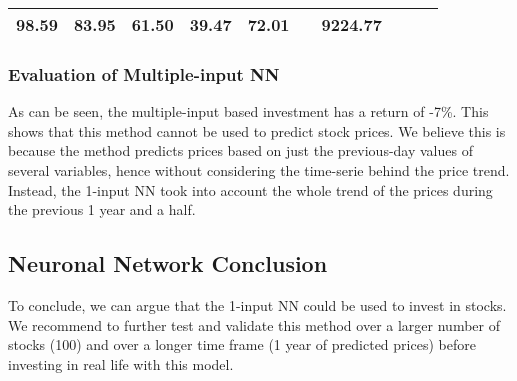 \documentclass[
  11pt,
]{article}
\begin{document}
\begin{longtable}[]{@{}llllllllll@{}}
\begin{minipage}[t]{0.06\columnwidth}
98.59\strut
\end{minipage} & \begin{minipage}[t]{0.06\columnwidth}\raggedright
83.95\strut
\end{minipage} & \begin{minipage}[t]{0.06\columnwidth}\raggedright
61.50\strut
\end{minipage} & \begin{minipage}[t]{0.06\columnwidth}\raggedright
39.47\strut
\end{minipage} & \begin{minipage}[t]{0.06\columnwidth}\raggedright
72.01\strut
\end{minipage} & \begin{minipage}[t]{0.13\columnwidth}\raggedright
\strut
\end{minipage} & \begin{minipage}[t]{0.08\columnwidth}\raggedright
9224.77\strut
\end{minipage}\tabularnewline
\bottomrule
\end{longtable}

\hypertarget{evaluation-of-multiple-input-nn}{%
\subsubsection{Evaluation of Multiple-input
NN}\label{evaluation-of-multiple-input-nn}}

As can be seen, the multiple-input based investment has a return of
-7\%. This shows that this method cannot be used to predict stock
prices. We believe this is because the method predicts prices based on
just the previous-day values of several variables, hence without
considering the time-serie behind the price trend. Instead, the 1-input
NN took into account the whole trend of the prices during the previous 1
year and a half.

\hypertarget{neuronal-network-conclusion}{%
\subsection{Neuronal Network
Conclusion}\label{neuronal-network-conclusion}}

To conclude, we can argue that the 1-input NN could be used to invest in
stocks. We recommend to further test and validate this method over a
larger number of stocks (100) and over a longer time frame (1 year of
predicted prices) before investing in real life with this model.

\newpage
\end{document}
